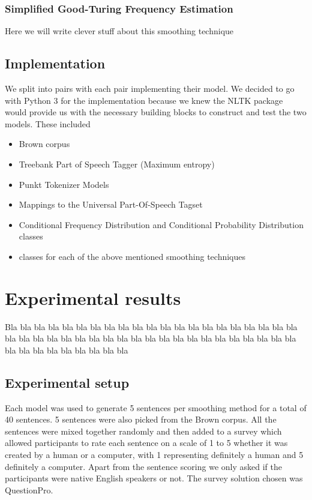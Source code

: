 \documentclass[a4paper,12pt]{article}
\begin{document}
\subsubsection{Simplified Good-Turing Frequency Estimation}
Here we will write clever stuff about this smoothing technique


\subsection{Implementation}
\label{sec:impl}

We split into pairs with each pair implementing their model. We decided to go with Python 3 for the implementation because we knew the NLTK package would provide us with the necessary building blocks to construct and test the two models. These included
\begin{itemize}
\item Brown corpus
\item Treebank Part of Speech Tagger (Maximum entropy)
\item Punkt Tokenizer Models
\item Mappings to the Universal Part-Of-Speech Tagset
\item Conditional Frequency Distribution and Conditional Probability Distribution classes
\item classes for each of the above mentioned smoothing techniques
\end{itemize}







\section{Experimental results}
\label{sec:exps}

Bla bla bla bla bla bla bla bla bla bla bla bla bla bla bla bla bla
bla bla bla bla bla bla bla bla bla bla bla bla bla bla bla bla bla
bla bla bla bla bla bla bla bla bla bla bla bla bla bla bla bla bla

\subsection{Experimental setup}
Each model was used to generate 5 sentences per smoothing method for a total of 40 sentences. 5 sentences were also picked from the Brown corpus. All the sentences were mixed together randomly and then added to a survey which allowed participants to rate each sentence on a scale of 1 to 5 whether it was created by a human or a computer, with 1 representing definitely a human and 5 definitely a computer. Apart from the sentence scoring we only asked if the participants were native English speakers or not. The survey solution chosen was QuestionPro.
\end{document}

